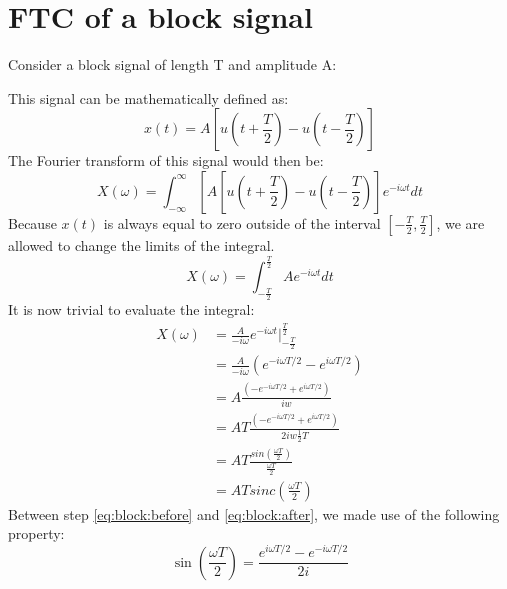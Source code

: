 \documentclass[]{subfiles}
\begin{document}
	\section{FTC of a block signal}
	Consider a block signal of length T and amplitude A:\\

	\begin{figure}[h]
		\centering
	\end{figure}
	This signal can be mathematically defined as:
	\begin{equation*}
		x(t) = A\left[ u(t+\frac{T}{2}) -u(t-\frac{T}{2})\right]
	\end{equation*}
	The Fourier transform of this signal would then be:
	\begin{equation*}
		X(\omega) = \int_{-\infty}^{\infty}\left[ A\left[ u(t+\frac{T}{2}) -u(t-\frac{T}{2})\right] e^{-i\omega t}dt
	\end{equation*}
	Because $x(t)$ is always equal to zero outside of the interval $\left[ -\frac{T}{2},\frac{T}{2}\right] $, we are allowed to change the limits of the integral.
	\begin{equation*}
		X(\omega) = \int_{-\frac{T}{2}}^{\frac{T}{2}}A e^{-i\omega t}dt
	\end{equation*}
	It is now trivial to evaluate the integral:
	\begin{align}
		X(\omega)&=\frac{A}{-i\omega}e^{-i\omega t} \bigg\vert_{-\frac{T}{2}}^{\frac{T}{2}}\\
		\label{eq:block:before}
		&= \frac{A}{-i\omega}(e^{-i\omega T/2}-e^{i\omega T/2})\\
		\label{eq:block:after}
        	&= {A}\frac{(-e^{-i\omega T/2}+e^{i\omega T/2})}{iw}\\
        	&= {AT}\frac{(-e^{-i\omega T/2}+e^{i\omega T/2})}{2iw\frac{1}{2}T}\\
		&= {AT}\frac{sin(\frac{\omega T}{2})}{{\frac{\omega T}{2}}}\\
		&=ATsinc(\frac{\omega T}{2})
	\end{align}
	Between step \ref{eq:block:before} and \ref{eq:block:after}, we made use of the following property:
	\begin{equation*}
		\sin(\frac{\omega T}{2}) = \frac{e^{i\omega T/2}-e^{-i\omega T/2}}{2i}
	\end{equation*}
\end{document}
